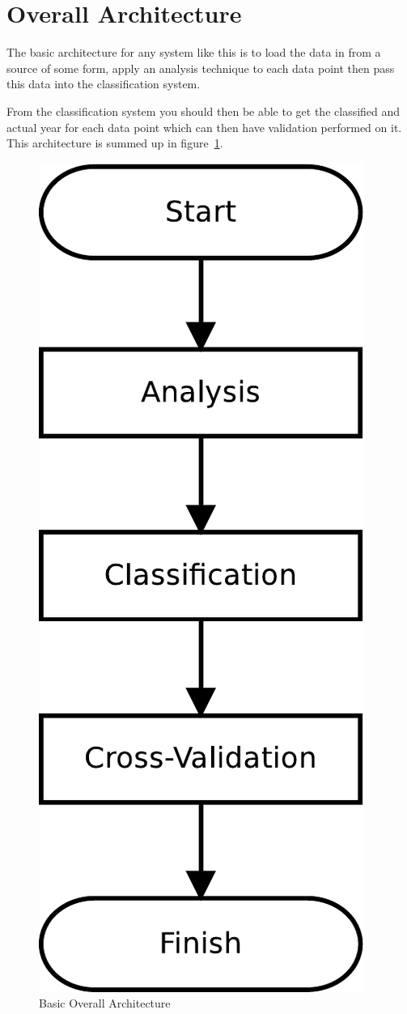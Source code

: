 \section{Overall Architecture}
The basic architecture for any system like this is to load the data in from a source of some form,
apply an analysis technique to each data point then pass this data into the classification system.

From the classification system you should then be able to get the classified and actual year for
each data point which can then have validation performed on it. This architecture is summed up in
figure~\ref{fig:basic-arch}.

\begin{figure}[h]
\centering
\includegraphics[scale=0.4]{img/basic-arch}
\caption{Basic Overall Architecture}\label{fig:basic-arch}
\end{figure}

